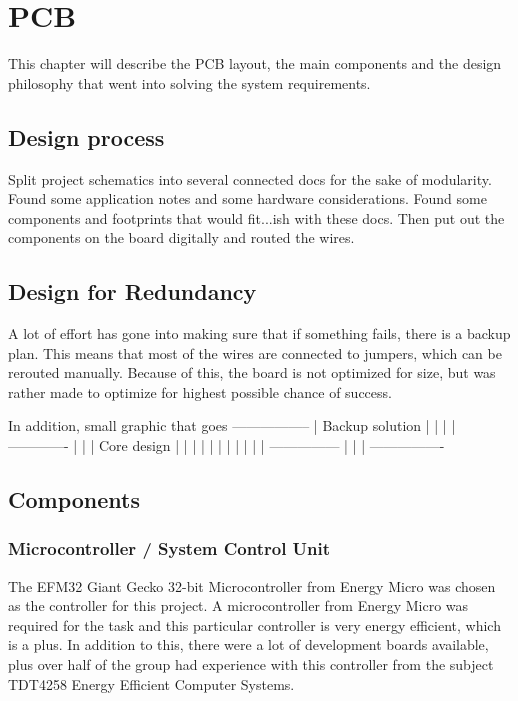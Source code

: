 \chapter{PCB}
\label{sec:pcb}

This chapter will describe the PCB layout, the main components and the design philosophy that went into solving the system requirements.

\section{Design process}
Split project schematics into several connected docs for the sake of modularity. Found some application notes and some hardware considerations. Found some components and footprints that would fit...ish with these docs. Then put out the components on the board digitally and routed the wires.


\section{Design for Redundancy}

A lot of effort has gone into making sure that if something fails, there is a backup plan.
This means that most of the wires are connected to jumpers, which can be rerouted manually.
Because of this, the board is not optimized for size, but was rather made to optimize for
highest possible chance of success.

In addition, small graphic that goes 
-----------------
| Backup solution |
|				  |
|  -------------  |
| | Core design | |
| |				| |
| |				| |
| --------------- |
|				  |
 ----------------

\section{Components}

\subsection{Microcontroller / System Control Unit}
The EFM32 Giant Gecko 32-bit Microcontroller from Energy Micro was chosen as the controller for this project.
A microcontroller from Energy Micro was required for the task and this particular controller is
very energy efficient, which is a plus.
In addition to this, there were a lot of development boards available,
plus over half of the group had experience with this controller from the subject
TDT4258 Energy Efficient Computer Systems.

